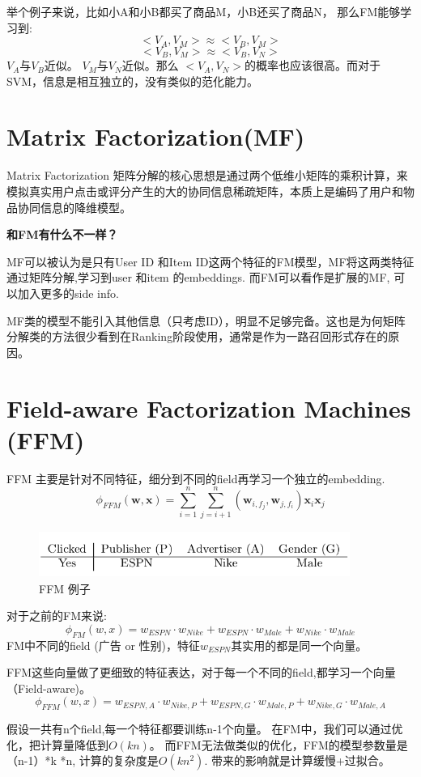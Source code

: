 \documentclass{article}
\begin{document}
\begin{CJK*}{UTF8}{gbsn}
举个例子来说，比如小A和小B都买了商品M，小B还买了商品N， 那么FM能够学习到:
$$<V_{A},V_{M}> \approx <V_{B},V_{M}>$$
$$<V_{B},V_{M}> \approx <V_{B},V_{N}>$$
$V_{A}$与$V_{B}$近似。 $V_{M}$与$V_{N}$近似。那么 $<V_{A},V_{N}>$的概率也应该很高。而对于SVM，信息是相互独立的，没有类似的范化能力。

\section{Matrix Factorization(MF)}
Matrix Factorization 矩阵分解的核心思想是通过两个低维小矩阵的乘积计算，来模拟真实用户点击或评分产生的大的协同信息稀疏矩阵，本质上是编码了用户和物品协同信息的降维模型。

\noindent
\textbf{和FM有什么不一样？}

MF可以被认为是只有User ID 和Item ID这两个特征的FM模型，MF将这两类特征通过矩阵分解,学习到user 和item 的embeddings. 而FM可以看作是扩展的MF, 可以加入更多的side info. 

MF类的模型不能引入其他信息（只考虑ID），明显不足够完备。这也是为何矩阵分解类的方法很少看到在Ranking阶段使用，通常是作为一路召回形式存在的原因。

\section{Field-aware Factorization Machines (FFM)}
FFM \cite{DBLP:conf/recsys/JuanZCL16} 主要是针对不同特征，细分到不同的field再学习一个独立的embedding.
$$\phi_{FFM}(\textbf{w},\textbf{x})=\sum_{i=1}^{n} \sum_{j=i+1}^{n}(\textbf{w}_{i,f_{j}},\textbf{w}_{j,f_{i}})\textbf{x}_{i} \textbf{x}_{j}$$

\begin{figure}[H]
\centering
\includegraphics[width=4in,height=0.6in]{ffm1}
\caption{FFM 例子}
\end{figure}
\noindent
对于之前的FM来说:
$$\phi_{FM}(w,x)=w_{ESPN}\cdot w_{Nike}+w_{ESPN}\cdot w_{Male}+w_{Nike}\cdot w_{Male}$$
FM中不同的field (广告 or 性别)，特征$w_{ESPN}$其实用的都是同一个向量。

FFM这些向量做了更细致的特征表达，对于每一个不同的field,都学习一个向量（Field-aware)。
$$\phi_{FFM}(w,x)=w_{ESPN,A}\cdot w_{Nike,P}+w_{ESPN,G}\cdot w_{Male,P}+w_{Nike,G}\cdot w_{Male,A}$$

假设一共有n个field,每一个特征都要训练n-1个向量。
在FM中，我们可以通过优化，把计算量降低到$O(kn)$。 而FFM无法做类似的优化，FFM的模型参数量是（n-1）*k *n, 计算的复杂度是$O(kn^{2})$. 带来的影响就是计算缓慢+过拟合。


\end{CJK*}
\end{document}
